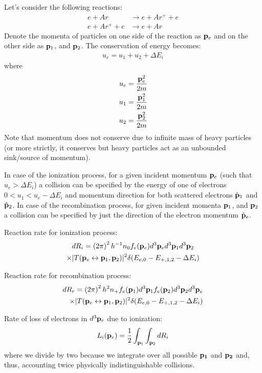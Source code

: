 \documentclass{article}[draft]
\begin{document}
Let's consider the following reactions:
\begin{align*}
	e + Ar &\rightarrow e + Ar^{+} + e \\
	e + Ar^{+} + e &\rightarrow e + Ar
\end{align*}
Denote the momenta of particles on one side of the reaction as $\mathbf{p}_e$ and on the other side as $\mathbf{p}_1$, and $\mathbf{p}_2$. The conservation of energy becomes:
\begin{align*}
u_{e} = u_{1} + u_{2} + \Delta E_i
\end{align*}
where
\begin{align*}
u_{e} &= \frac{\mathbf{p}_e^2}{2m} 
\\
u_{1} &= \frac{\mathbf{p}_1^2}{2m} 
\\
u_{2} &= \frac{\mathbf{p}_2^2}{2m} 
\end{align*}
Note that momentum does not conserve due to infinite mass of heavy particles (or more strictly, it conserves but heavy particles act as an unbounded sink/source of momentum).


In case of the ionization process, for a given incident momentum $\mathbf{p}_e$ (such that $u_{e} > \Delta E_i$) a collision can be specified by the energy of one of electrons $0 < u_{1} < u_{e} -\Delta E_i$ and momentum direction for both scattered electrons $\hat{\mathbf{p}}_{1}$ and $\hat{\mathbf{p}}_{2}$. In case of the recombination process, for given incident momenta $\mathbf{p}_1$, and $\mathbf{p}_2$ a collision can be specified by just the direction of the electron momentum $\hat{\mathbf{p}}_{e}$.

Reaction rate for ionization process:
\begin{multline*}
d R_i = \left( 2 \pi \right)^2 \planck^{-1} n_0
f_e\of{\vect{p}_e} d^3 \vect{p}_e d^3 \vect{p}_1 d^3 \vect{p}_2
\\
\times
| T\of{\vect{p}_e \leftrightarrow \vect{p}_1, \vect{p}_2} |^2
\delta\of{E_{e,0} - E_{+,1,2} - \Delta E_i}
\end{multline*}

Reaction rate for recombination process:
\begin{align*}
d R_r = \left( 2 \pi  \right)^2 \planck^2 n_+
f_e\of{\vect{p}_1} d^3 \vect{p}_1  f_e\of{\vect{p}_2} d^3 \vect{p}_2 
d^3 \vect{p}_e
\\
\times
| T\of{\vect{p}_e \leftrightarrow \vect{p}_1, \vect{p}_2} |^2
\delta\of{E_{e,0} - E_{+,1,2} - \Delta E_i}
\end{align*}

Rate of loss of electrons in $d^3 \mathbf{p}_e$ due to ionization:
\begin{align*}
L_i\of{\vect{p}_e} = \frac{1}{2} \int_{\vect{p}_1} \int_{\vect{p}_2} d R_i
\end{align*}
where we divide by two because we integrate over all possible $\mathbf{\mathbf{p}_1}$ and $\mathbf{\mathbf{p}_2}$ and, thus, accounting twice physically indistinguishable collisions.
\end{document}
